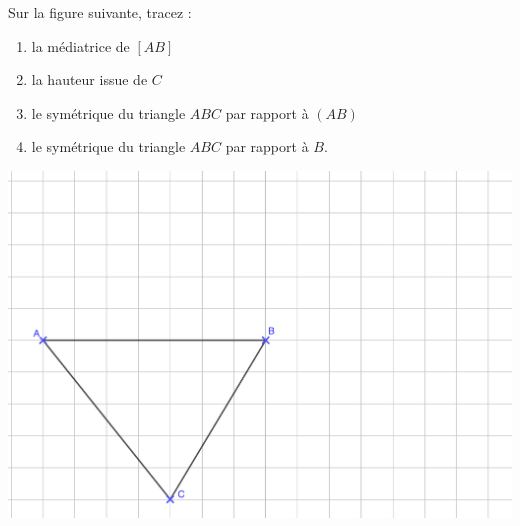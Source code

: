 \documentclass[14pt]{extreport}
\theoremstyle{plain}
\begin{document}
Sur la figure suivante, tracez : 
\begin{enumerate}
\item la médiatrice de $[AB]$
\item la hauteur issue de $C$
\item le symétrique du triangle $ABC$ par rapport à $(AB)$
\item le symétrique du triangle $ABC$ par rapport à $B$.
\end{enumerate}
\includegraphics[scale=0.5]{Exos}
\end{document}
